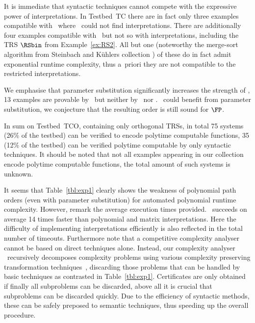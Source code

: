 \documentclass{LMCS}
\begin{document}
It is immediate that syntactic techniques cannot compete with the expressive 
power of interpretations. 
In Testbed~\textsf{TC} there are in fact only three examples 
compatible with \POPSTARP\ where \TCT~could not find interpretations.
There are additionally four examples compatible with \LMPO\ but not so with interpretations, 
including the TRS $\RSbin$ from Example~\ref{ex:RS2}. 
All but one (noteworthy the merge-sort algorithm from Steinbach and K\"uhlers collection 
\cite[Example~2.43]{SK90}) 
of these do in fact admit exponential runtime complexity, 
thus a~priori they are not compatible to the restricted interpretations.


We emphasise that parameter substitution significantly increases the strength of 
\POPSTAR, 13 examples are provable by \POPSTARP\ but neither by \POPSTAR\ nor \LMPO.\@
\LMPO\ could benefit from parameter substitution, 
we conjecture that the resulting order is still sound for $\FP$. 

In sum on Testbed~\textsf{TCO}, containing only orthogonal TRSs, 
in total 75 systems (26\% of the testbed)
can be verified to encode polytime computable functions, 35 (12\% of the testbed)
can be verified polytime computable by only syntactic techniques. 
It should be noted that not all examples appearing in our collection encode polytime computable 
functions, the total amount of such systems is unknown. 

It seems that Table~\ref{tbl:exp1} clearly shows the weakness of polynomial
path orders (even with parameter substitution) for automated polynomial
runtime complexity. However, remark the average execution times provided.
\POPSTARP\ succeeds on average 14 times faster than polynomial and 
matrix interpretations. Here the difficulty of implementing interpretations efficiently 
is also reflected in the total number of timeouts.
Furthermore note that a competitive complexity
analyser cannot be based on direct techniques alone. 
Instead, our complexity analyser \TCT\ recursively decomposes complexity problems using 
various complexity preserving transformation techniques~\cite{AM13}, 
discarding those problems that can be handled by basic techniques as 
contrasted in Table~\ref{tbl:exp1}.
Certificates are only obtained
if finally all subproblems can be discarded,
above all it is crucial that subproblems can be discarded 
quickly. Due to the efficiency of syntactic methods, these 
can be safely preposed to semantic techniques, thus speeding up the overall procedure.
\end{document}
